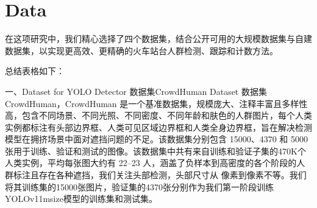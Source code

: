 \section{Data}\label{section::data}


在这项研究中，我们精心选择了四个数据集，结合公开可用的大规模数据集与自建数据集，以实现更高效、更精确的火车站台人群检测、跟踪和计数方法。

总结表格如下：
\begin{center}
    \label{tab:datasets}
\end{center}

一、Dataset for YOLO Detector
    数据集CrowdHuman Dataset
    数据集CrowdHuman\cite{shao2018crowdhuman}，CrowdHuman 是一个基准数据集，规模庞大、注释丰富且多样性高，包含不同场景、不同光照、不同密度、不同年龄和肤色的人群图片，每个人类实例都标注有头部边界框、人类可见区域边界框和人类全身边界框，旨在解决检测模型在拥挤场景中面对遮挡问题的不足。该数据集分别包含 15000、4370 和 5000 张用于训练、验证和测试的图像。该数据集中共有来自训练和验证子集的470K个人类实例，平均每张图大约有 22–23 人，涵盖了负样本到高密度的各个阶段的人群标注且存在各种遮挡，我们关注头部检测，头部尺寸从 像素到像素不等。我们将其训练集的15000张图片，验证集的4370张分别作为我们第一阶段训练YOLOv11msize模型的训练集和测试集。

